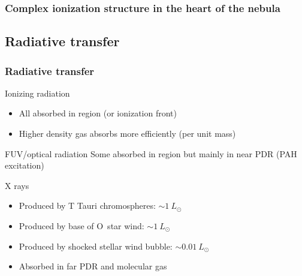 \documentclass[presentation]{beamer}
\begin{document}
\begin{frame}
  \frametitle{Complex ionization structure in the heart of the nebula}
  \begin{centering}
    \par
  \end{centering}
\end{frame}

\subsection{Radiative transfer}

\begin{frame}
  \frametitle{Radiative transfer}
  \begin{block}{Ionizing radiation}
    \begin{itemize}
    \item All absorbed in \hii{} region (or ionization front)
    \item Higher density gas absorbs more efficiently (per unit mass)
    \end{itemize}
  \end{block}
  \begin{block}{FUV/optical radiation}
    Some absorbed in \hii{} region but mainly in near PDR (PAH excitation)
  \end{block}
  \begin{block}{X rays}
    \begin{itemize}
    \item Produced by T Tauri chromospheres: \(\sim 1~L_\odot\)
    \item Produced by base of O~star wind: \(\sim 1~L_\odot\)
    \item Produced by shocked stellar wind bubble: \(\sim 0.01~L_\odot\)
    \item Absorbed in far PDR and molecular gas
    \end{itemize} 
  \end{block}
\end{frame}
\end{document}
